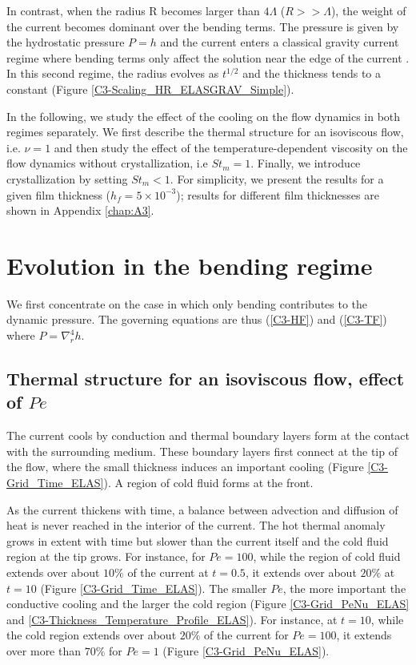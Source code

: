 In  contrast,  when  the  radius  R  becomes  larger  than  $4\Lambda$
($R>>\Lambda$), the  weight of the  current becomes dominant  over the
bending  terms.  The  pressure is  given by  the hydrostatic  pressure
$P =  h$ and  the current  enters a  classical gravity  current regime
where bending  terms only  affect the  solution near  the edge  of the
current  \citep{Huppert:1982a,Michaut:2011kg,Lister:2013ia}.  In  this
second regime, the radius evolves as $t^{1/2}$ and the thickness tends
to a constant (Figure \ref{C3-Scaling_HR_ELASGRAV_Simple}).

In  the following,  we study  the effect  of the  cooling on  the flow
dynamics in  both regimes  separately. We  first describe  the thermal
structure  for an  isoviscous flow,  i.e. $\nu=1$  and then  study the
effect  of the  temperature-dependent viscosity  on the  flow dynamics
without  crystallization,  i.e  $St_m   =1$.   Finally,  we  introduce
crystallization by  setting $St_m<1$.  For simplicity,  we present the
results for  a given  film thickness ($h_f=5\times  10^{-3}$); results
for different film thicknesses are shown in Appendix \ref{chap:A3}.

\section{Evolution in the bending regime}
\label{C3-sec:evol-bend-regime}

We first concentrate on the case  in which only bending contributes to
the dynamic pressure.  The  governing equations are thus (\ref{C3-HF})
and (\ref{C3-TF}) where $P=\nabla_r^4h$.

\subsection{Thermal structure for an isoviscous flow, effect of $Pe$}
\label{C3-sec:thermal-structure-an}

The current  cools by conduction  and thermal boundary layers  form at
the contact with the surrounding  medium.  These boundary layers first
connect at the  tip of the flow, where the  small thickness induces an
important cooling (Figure \ref{C3-Grid_Time_ELAS}).   A region of cold
fluid forms at the front.

As the  current thickens  with time, a  balance between  advection and
diffusion of heat is never reached in the interior of the current. The
hot thermal  anomaly grows  in extent  with time  but slower  than the
current  itself and  the  cold fluid  region at  the  tip grows.   For
instance, for $Pe  =100$, while the region of cold  fluid extends over
about $10\%$ of  the current at $t=0.5$, it extends  over about $20\%$
at $t  =10$ (Figure  \ref{C3-Grid_Time_ELAS}).  The smaller  $Pe$, the
more important the  conductive cooling and the larger  the cold region
(Figure                   \ref{C3-Grid_PeNu_ELAS}                  and
\ref{C3-Thickness_Temperature_Profile_ELAS}).    For    instance,   at
$t=10$, while the cold region extends over about $20\%$ of the current
for  $Pe=100$, it  extends over  more than  $70\%$ for  $Pe=1$ (Figure
\ref{C3-Grid_PeNu_ELAS}).

